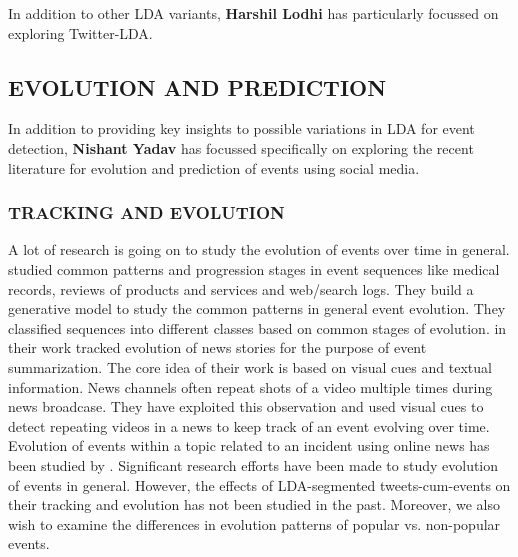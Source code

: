 In addition to other LDA variants, {\bf Harshil Lodhi} has particularly focussed on exploring Twitter-LDA.

\subsection{\uppercase{Evolution and Prediction}}
In addition to providing key insights to possible variations in LDA for event detection, {\bf Nishant Yadav} has focussed specifically on exploring the recent literature for evolution and prediction of events using social media.

\subsubsection{\uppercase{Tracking and Evolution}}
A lot of research is going on to study the evolution of events over time in general. \cite{yang2014finding} studied common patterns and progression stages in event sequences like medical records, reviews of products and services and web/search logs. They build a generative model to study the common patterns in general event evolution. They classified sequences into different classes based on common stages of evolution. \cite{duygulu2004towards} in their work tracked evolution of news stories for the purpose of event summarization. The core idea of their work is based on visual cues and textual information. News channels often repeat shots of a video multiple times during news broadcase. They have exploited this observation and used visual cues to detect repeating videos in a news to keep track of an event evolving over time. Evolution of events within a topic related to an incident using online news has been studied by \cite{yang2009discovering}. Significant research efforts have been made to study evolution of events in general. However, the effects of LDA-segmented tweets-cum-events on their tracking and evolution has not been studied in the past. Moreover, we also wish to examine the differences in evolution patterns of popular vs. non-popular events.

